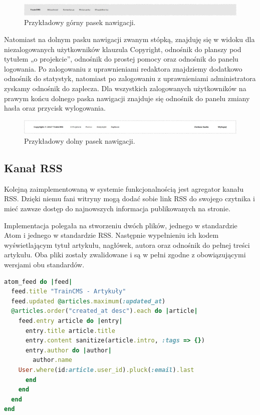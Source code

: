 \documentclass[openright]{xmgr}
\begin{document}
\begin{figure}[!tbh]
\centering
\includegraphics[width=\linewidth]{fig/navbar}
\caption{Przykładowy górny pasek nawigacji.}
\end{figure}

Natomiast na dolnym pasku nawigacji zwanym stópką, znajduję się w widoku dla niezalogowanych użytkowników klauzula Copyright, odnośnik do planszy pod tytułem „o projekcie”, odnośnik do prostej pomocy oraz odnośnik do panelu logowania. Po zalogowaniu z uprawnieniami redaktora znajdziemy dodatkowo odnośnik do statystyk, natomiast po zalogowaniu z uprawnieniami administratora zyskamy odnośnik do zaplecza. Dla wszystkich zalogowanych użytkowników na prawym końcu dolnego paska nawigacji znajduje się odnośnik do panelu zmiany hasła oraz przycisk wylogowania.

\begin{figure}[!tbh]
\centering
\includegraphics[width=\linewidth]{fig/footbar}
\caption{Przykładowy dolny pasek nawigacji.}
\end{figure}

\newpage

\subsection{Kanał RSS}
Kolejną zaimplementowaną w systemie funkcjonalnością jest agregator kanału RSS. Dzięki niemu fani witryny mogą dodać sobie link RSS do swojego czytnika i mieć zawsze dostęp do najnowszych informacja publikowanych na stronie. 

Implementacja polegała na stworzeniu dwóch plików, jednego w standardzie Atom i jednego w standardzie RSS. Następnie wypełnieniu ich kodem wyświetlającym tytuł artykułu, nagłówek, autora oraz odnośnik do pełnej treści artykułu. Oba pliki zostały zwalidowane i są w pełni zgodne z obowiązującymi wersjami obu standardów.

\begin{lstlisting}[language=ruby, caption={Kod generatora spływu wiadmości w standardzie Atom}]
atom_feed do |feed|
  feed.title "TrainCMS - Artykuły"
  feed.updated @articles.maximum(:updated_at)
  @articles.order("created_at desc").each do |article|
    feed.entry article do |entry|
      entry.title article.title
      entry.content sanitize(article.intro, :tags => {})
      entry.author do |author|
        author.name 
	User.where(id:article.user_id).pluck(:email).last
      end
    end
  end
end
\end{lstlisting} 
\end{document}
